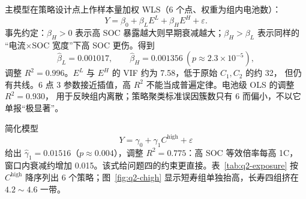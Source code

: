 主模型在策略设计点上作样本量加权 WLS（6 个点、权重为组内电池数）：
\begin{equation}
Y=\beta_0+\beta_L E^{L}+\beta_H E^{H}+\varepsilon.
\label{eq:q2-wls}
\end{equation}
事先约定：\(\beta_H>0\) 表示高 SOC 暴露越大则早期衰减越大；\(\beta_H>\beta_L\) 表示同样的
“电流\(\times\)SOC 宽度”下高 SOC 更伤。得到
\[
\hat\beta_L=0.001017,\qquad
\hat\beta_H=0.001356\ (p\approx 2.3\times 10^{-5}),
\]
调整 \(R^2=0.996\)。\(E^{L}\) 与 \(E^{H}\) 的 VIF 约为 7.58，低于原始 \(C_1,C_2\) 的约 32，
但仍有共线。6 点 3 参数接近插值，高 \(R^2\) 不能当成普遍定律。电池级 OLS 的调整 \(R^2=0.930\)，
用于反映组内离散；策略聚类标准误因簇数只有 6 而偏小，不以它单报“极显著”。

简化模型
\begin{equation}
Y=\gamma_0+\gamma_1 C^{\mathrm{high}}+\varepsilon
\label{eq:q2-simple}
\end{equation}
给出 \(\hat\gamma_1=0.01516\)（\(p\approx 0.004\)），调整 \(R^2=0.775\)：高 SOC 等效倍率每高 1C，
窗口内衰减约增加 0.015。该式给问题四的约束更直接。表~\ref{tab:q2-exposure} 按 \(C^{\mathrm{high}}\)
降序列出 6 个策略；图~\ref{fig:q2-chigh} 显示短寿组单独抬高，长寿四组挤在 \(4.2\sim 4.6\) 一带。

\begin{table}[htbp]
\centering
\caption{\(Q^\ast=50\%\) 时各策略的两窗口暴露量与实测衰减}
\label{tab:q2-exposure}
\small
\setlength{\tabcolsep}{3.5pt}
\end{table}

